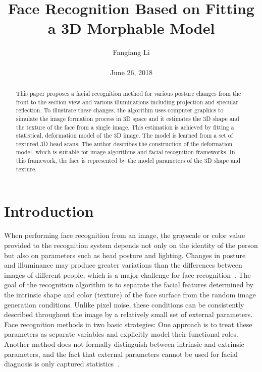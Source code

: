 \documentclass[10pt,twocolumn,letterpaper]{article}
\begin{document}
\title{\textbf{Face Recognition Based on Fitting a 3D Morphable Model}}
\author{Fangfang Li\\\\June 26, 2018}
\maketitle
\begin{abstract}
This paper proposes a facial recognition method for various posture changes from the front to the section view and various illuminations including projection and specular reflection. To illustrate these changes, the algorithm uses computer graphics to simulate the image formation process in 3D space and it estimates the 3D shape and the texture of the face from a single image. This estimation is achieved by fitting a statistical, deformation model of the 3D image. The model is learned from a set of textured 3D head scans. The author describes the construction of the deformation model, which is suitable for image algorithms and facial recognition frameworks. In this framework, the face is represented by the model parameters of the 3D shape and texture.
\end{abstract}
\section{Introduction}
When performing face recognition from an image, the grayscale or color value provided to the recognition system depends not only on the identity of the person but also on parameters such as head posture and lighting. Changes in posture and illuminance may produce greater variations than the differences between images of different people, which is a major challenge for face recognition~\cite{Liu2016Joint}. The goal of the recognition algorithm is to separate the facial features determined by the intrinsic shape and color (texture) of the face surface from the random image generation conditions. Unlike pixel noise, these conditions can be consistently described throughout the image by a relatively small set of external parameters. Face recognition methods in two basic strategies: One approach is to treat these parameters as separate variables and explicitly model their functional roles. Another method does not formally distinguish between intrinsic and extrinsic parameters, and the fact that external parameters cannot be used for facial diagnosis is only captured statistics~\cite{Lin2010Accurate}.
\end{document}
